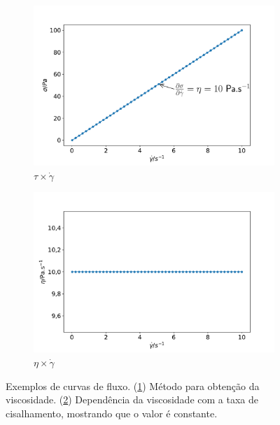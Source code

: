 			\begin{figure}[h]
				\begin{subfigure}[t]{.5\textwidth}
					\includegraphics[width=\textwidth]{./imagens/reologia/newtoniano_exemplo_tauGP}
					\caption{\(\tau \times \dot{\gamma}\)}
					\label{fig:reol_newt_tauGP}
				\end{subfigure}%
				\begin{subfigure}[t]{.5\textwidth}
					\includegraphics[width=\textwidth]{./imagens/reologia/newtoniano_exemplo_etaGP}
					\caption{\(\eta \times \dot{\gamma}\)}
					\label{fig:reol_newt_etaGP}
				\end{subfigure}
				\caption{Exemplos de curvas de fluxo. (\ref{fig:reol_newt_tauGP}) Método para obtenção da viscosidade. (\ref{fig:reol_newt_etaGP}) Dependência da viscosidade com a taxa de cisalhamento, mostrando que o valor é constante.}
				\label{fig:reol_newt_exemplos}
			\end{figure}
				
